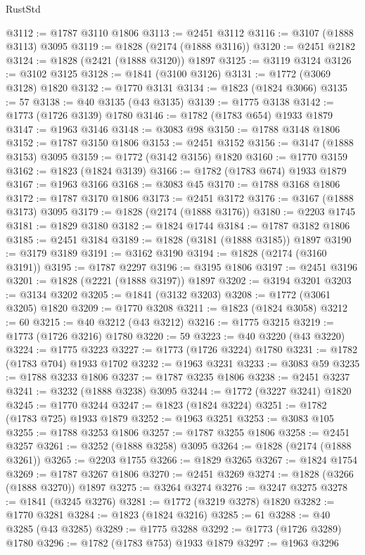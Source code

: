 \begin{lexlean}{RustStd}
\begin{coremodule}
@3112 := @1787 @3110 @1806
@3113 := @2451 @3112
@3116 := @3107 (@1888 @3113) @3095
@3119 := @1828 (@2174 (@1888 @3116))
@3120 := @2451 @2182
@3124 := @1828 (@2421 (@1888 @3120)) @1897
@3125 := @3119 @3124
@3126 := @3102 @3125
@3128 := @1841 (@3100 @3126)
@3131 := @1772 (@3069 @3128) @1820
@3132 := @1770 @3131
@3134 := @1823 (@1824 @3066)
@3135 := 57
@3138 := @40 @3135 (@43 @3135)
@3139 := @1775 @3138
@3142 := @1773 (@1726 @3139) @1780
@3146 := @1782 (@1783 @654) @1933 @1879
@3147 := @1963 @3146
@3148 := @3083 @98
@3150 := @1788 @3148 @1806
@3152 := @1787 @3150 @1806
@3153 := @2451 @3152
@3156 := @3147 (@1888 @3153) @3095
@3159 := @1772 (@3142 @3156) @1820
@3160 := @1770 @3159
@3162 := @1823 (@1824 @3139)
@3166 := @1782 (@1783 @674) @1933 @1879
@3167 := @1963 @3166
@3168 := @3083 @45
@3170 := @1788 @3168 @1806
@3172 := @1787 @3170 @1806
@3173 := @2451 @3172
@3176 := @3167 (@1888 @3173) @3095
@3179 := @1828 (@2174 (@1888 @3176))
@3180 := @2203 @1745
@3181 := @1829 @3180
@3182 := @1824 @1744
@3184 := @1787 @3182 @1806
@3185 := @2451 @3184
@3189 := @1828 (@3181 (@1888 @3185)) @1897
@3190 := @3179 @3189
@3191 := @3162 @3190
@3194 := @1828 (@2174 (@3160 @3191))
@3195 := @1787 @2297
@3196 := @3195 @1806
@3197 := @2451 @3196
@3201 := @1828 (@2221 (@1888 @3197)) @1897
@3202 := @3194 @3201
@3203 := @3134 @3202
@3205 := @1841 (@3132 @3203)
@3208 := @1772 (@3061 @3205) @1820
@3209 := @1770 @3208
@3211 := @1823 (@1824 @3058)
@3212 := 60
@3215 := @40 @3212 (@43 @3212)
@3216 := @1775 @3215
@3219 := @1773 (@1726 @3216) @1780
@3220 := 59
@3223 := @40 @3220 (@43 @3220)
@3224 := @1775 @3223
@3227 := @1773 (@1726 @3224) @1780
@3231 := @1782 (@1783 @704) @1933 @1702
@3232 := @1963 @3231
@3233 := @3083 @59
@3235 := @1788 @3233 @1806
@3237 := @1787 @3235 @1806
@3238 := @2451 @3237
@3241 := @3232 (@1888 @3238) @3095
@3244 := @1772 (@3227 @3241) @1820
@3245 := @1770 @3244
@3247 := @1823 (@1824 @3224)
@3251 := @1782 (@1783 @725) @1933 @1879
@3252 := @1963 @3251
@3253 := @3083 @105
@3255 := @1788 @3253 @1806
@3257 := @1787 @3255 @1806
@3258 := @2451 @3257
@3261 := @3252 (@1888 @3258) @3095
@3264 := @1828 (@2174 (@1888 @3261))
@3265 := @2203 @1755
@3266 := @1829 @3265
@3267 := @1824 @1754
@3269 := @1787 @3267 @1806
@3270 := @2451 @3269
@3274 := @1828 (@3266 (@1888 @3270)) @1897
@3275 := @3264 @3274
@3276 := @3247 @3275
@3278 := @1841 (@3245 @3276)
@3281 := @1772 (@3219 @3278) @1820
@3282 := @1770 @3281
@3284 := @1823 (@1824 @3216)
@3285 := 61
@3288 := @40 @3285 (@43 @3285)
@3289 := @1775 @3288
@3292 := @1773 (@1726 @3289) @1780
@3296 := @1782 (@1783 @753) @1933 @1879
@3297 := @1963 @3296

\end{coremodule}
\end{lexlean}
